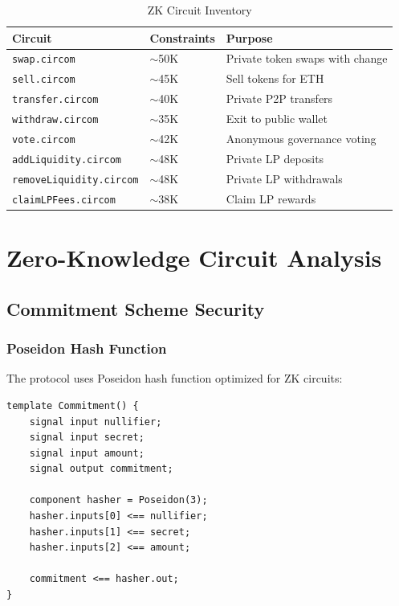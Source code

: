\documentclass[11pt,a4paper]{article}
\begin{document}
\begin{table}[H]
\centering
\begin{tabular}{|l|l|p{6cm}|}
\hline
\textbf{Circuit} & \textbf{Constraints} & \textbf{Purpose} \\
\hline
\texttt{swap.circom} & $\sim$50K & Private token swaps with change \\
\texttt{sell.circom} & $\sim$45K & Sell tokens for ETH \\
\texttt{transfer.circom} & $\sim$40K & Private P2P transfers \\
\texttt{withdraw.circom} & $\sim$35K & Exit to public wallet \\
\texttt{vote.circom} & $\sim$42K & Anonymous governance voting \\
\texttt{addLiquidity.circom} & $\sim$48K & Private LP deposits \\
\texttt{removeLiquidity.circom} & $\sim$48K & Private LP withdrawals \\
\texttt{claimLPFees.circom} & $\sim$38K & Claim LP rewards \\
\hline
\end{tabular}
\caption{ZK Circuit Inventory}
\end{table}

\section{Zero-Knowledge Circuit Analysis}

\subsection{Commitment Scheme Security}

\subsubsection{Poseidon Hash Function}

The protocol uses Poseidon hash function optimized for ZK circuits:

\begin{lstlisting}[style=circom, caption={Commitment Template}]
template Commitment() {
    signal input nullifier;
    signal input secret;
    signal input amount;
    signal output commitment;

    component hasher = Poseidon(3);
    hasher.inputs[0] <== nullifier;
    hasher.inputs[1] <== secret;
    hasher.inputs[2] <== amount;

    commitment <== hasher.out;
}
\end{lstlisting}
\end{document}

